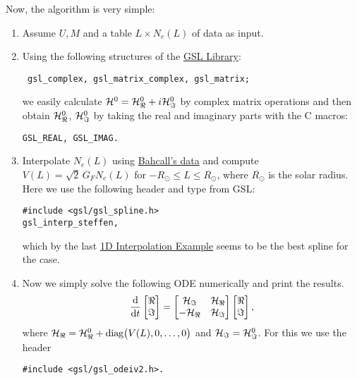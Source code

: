 \documentclass[a4paper,fleqn,12pt]{article}
\begin{document}
Now, the algorithm is very simple:
\begin{enumerate}

\item Assume $U, M$ and a table $L \times N_e(L)$ of data as input.

\item Using the following structures of the \href{https://www.gnu.org/software/gsl/doc/html/}{GSL Library}:
\begin{verbatim} gsl_complex, gsl_matrix_complex, gsl_matrix; \end{verbatim}
we easily calculate $\H^0 = \H^0_\real + i\H^0_\imaginary$ by complex matrix operations and then obtain $\H^0_\real$, $\H^0_\imaginary$ by taking the real and imaginary parts with the C macros:
\begin{verbatim}
GSL_REAL, GSL_IMAG.
\end{verbatim}

\item Interpolate $N_e(L)$ using \href{http://www.sns.ias.edu/~jnb/SNdata/sndata.html}{Bahcall's data} and compute $V(L) = \sqrt{2} \, G_F N_e(L)$ for $-R_\odot \leq L \leq R_\odot$, where $R_\odot$ is the solar radius. Here we use the following header and type from GSL:
\begin{verbatim}
#include <gsl/gsl_spline.h>
gsl_interp_steffen,
\end{verbatim}
which by the last \href{https://www.gnu.org/software/gsl/doc/html/interp.html#d-interpolation-example-programs}{1D Interpolation Example} seems to be the best spline for the case.

\item Now we simply solve the following ODE numerically and print the results.
$$
\dv{}{t}
\begin{bmatrix}
\real \\ \imaginary
\end{bmatrix}
=
\begin{bmatrix}
\H_\imaginary & \H_\real \\
-\H_\real & \H_\imaginary
\end{bmatrix}
\begin{bmatrix}
\real \\ \imaginary
\end{bmatrix},
$$
where $\H_\real = \H^0_\real + \text{diag}\big(V(L), 0, \ldots, 0\big)$ and $\H_\imaginary = \H^0_\imaginary$. For this we use the header
\begin{verbatim}
#include <gsl/gsl_odeiv2.h>.
\end{verbatim}

\end{enumerate}
\end{document}

